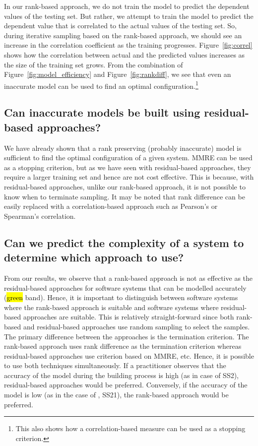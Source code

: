 \documentclass[sigconf]{acmart}
\DeclareRobustCommand{\hlgreen}[1]{{\sethlcolor{Mygreen}\textcolor{white}{\hl{#1}}}}
\begin{document}
In our rank-based approach, we do not train the model to predict the dependent values of the testing set. But rather, we attempt to train the model to predict the dependent value that is correlated to the actual values of the testing set. So, during iterative sampling based on the rank-based approach, we should see an increase in the correlation coefficient as the training progresses. Figure~\ref{fig:correl} shows how the correlation between actual and the predicted values increases as the size of the training set grows. From the combination of Figure~\ref{fig:model_efficiency} and Figure~\ref{fig:rankdiff}, we see that even an inaccurate model can be used to find an optimal configuration.\footnote{This also shows how a correlation-based measure can be used as a stopping criterion.}


\subsection{Can inaccurate models be built using residual-based approaches?}
We have already shown that a rank preserving (probably inaccurate) model is sufficient to find the optimal configuration of a given system. MMRE can be used as a stopping criterion, but as we have seen with residual-based approaches, they require a larger training set and hence are not cost effective. This is because, with residual-based approaches, unlike our rank-based approach, it is not possible to know when to terminate sampling. 
It may be noted that rank difference can be easily replaced with a correlation-based approach such as Pearson's or Spearman's correlation.


\subsection{Can we predict the complexity of a system to determine which approach to use?}
From our results, we observe that a rank-based approach is not as effective as the residual-based approaches for software systems that can be modelled accurately (\hlgreen{green} band). Hence, it is important to distinguish between software systems where the rank-based approach is suitable and software systems where residual-based approaches are suitable. This is relatively straight-forward since both rank-based and residual-based approaches use random sampling to select the samples. The primary difference between the approaches is the termination criterion. The rank-based approach uses rank difference as the termination criterion whereas residual-based approaches use criterion based on MMRE, etc. Hence, it is possible to use both techniques simultaneously. If a practitioner observes that the accuracy of the model during the building process is high (as in case of SS2), residual-based approaches would be preferred. Conversely, if the accuracy of the model is low (as in the case of 
, SS21), the rank-based approach would be preferred.
\end{document}
